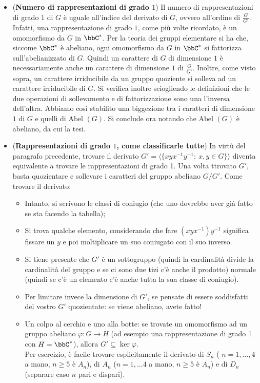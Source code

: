 \documentclass[a4paper,NoNotes,GeneralMath]{stdmdoc}
\newcommand{\Abel}{\text{Abel }}
\begin{document}
\begin{itemize}
		\item ({\bf Numero di rappresentazioni di grado $1$}) Il numero di rappresentazioni di grado $1$ di $G$ è uguale all'indice del derivato di $G$, ovvero all'ordine di $\frac{G}{G'}$. \\
		Infatti, una rappresentazione di grado $1$, come più volte ricordato, è un omomorfismo da $G$ in $\bbC^{*}$. Per la teoria dei gruppi elementare si ha che, siccome $\bbC^{*}$ è abeliano, ogni omomorfismo da $G$ in $\bbC^{*}$ si fattorizza sull'abelianizzato di $G$. Quindi un carattere di $G$ di dimensione $1$ è necessariamente anche un carattere di dimensione $1$ di $\frac{G}{G'}$. Inoltre, come visto sopra, un carattere irriducibile da un gruppo quoziente si solleva ad un carattere irriducibile di $G$. Si verifica inoltre sciogliendo le definizioni che le due operazioni di sollevamento e di fattorizzazione sono una l'inversa dell'altra. Abbiamo così stabilito una biggezione tra i caratteri di dimensione $1$ di $G$ e quelli di $\Abel(G)$. Si conclude ora notando che $\Abel(G)$ è abeliano, da cui la tesi.

		\item ({\bf Rappresentazioni di grado $1$, come classificarle tutte}) In virtù del paragrafo precedente, trovare il derivato $G' = \langle \{ xyx^{-1}y^{-1}:\ x,y \in G\} \rangle$ diventa equivalente a trovare le rappresentazioni di grado 1. Una volta ttrovato $G'$, basta quozientare e sollevare i caratteri del gruppo abeliano $G/G'$. Come trovare il derivato:
		\begin{itemize}
			\item Intanto, si scrivono le classi di coniugio (che uno dovrebbe aver già fatto se sta facendo la tabella);
			\item Si trova qualche elemento, considerando che fare $(xyx^{-1})y^{-1}$ significa fissare un $y$ e poi moltiplicare un suo coniugato con il suo inverso.
			\item Si tiene presente che $G'$ è un sottogruppo (quindi la cardinalità divide la cardinalità del gruppo e se ci sono due tizi c'è anche il prodotto) normale (quindi se c'è un elemento c'è anche tutta la sua classe di coniugio). 
			\item Per limitare invece la dimensione di $G'$, se pensate di essere soddisfatti del vostro $G'$ quozientate: se viene abeliano, avete fatto!
			\item Un colpo al cerchio e uno alla botte: se trovate un omomorfismo ad un gruppo abeliano $\varphi:G \to H$ (ad esempio una rappresentazione di grado 1 con $H = \bbC^*$), allora  $G' \subseteq \ker \varphi$. \\
			Per esercizio, è facile trovare esplicitamente il derivato di $S_n$ ( $n=1, \ldots, 4$ a mano, $n \ge 5$ è $A_n$), di $A_n$ ($n=1, \ldots 4$ a mano, $n \ge 5$ è $A_n$) e di $D_n$ (separare caso $n$ pari e dispari).
		\end{itemize}


\end{itemize}
\end{document}
